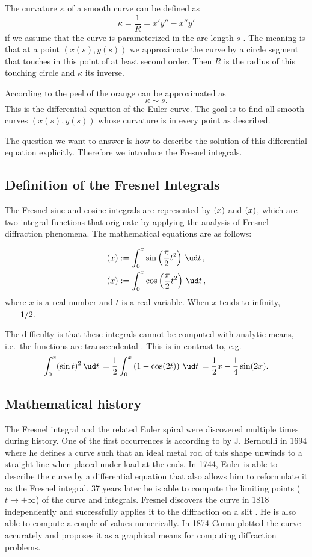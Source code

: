 \documentclass[12pt]{article}
\let\C=\relax
\DeclareMathOperator\C{C} %
\def\d#1{{\,\ud#1\,}}
\let\S=\relax
\DeclareMathOperator\S{S} %
\begin{document}
The curvature $\kappa$ of a smooth curve can be defined as 
\[  \kappa=\frac1R = x'y'' -x''y'
\] if we assume that the curve is parameterized in the arc length $s$ \cite{BH12}.  The meaning is that at a point $(x(s),y(s))$ we approximate the curve by a circle segment that touches in this point of at least second order.  Then $R$ is the radius of this touching circle and $\kappa$ its inverse.

According to \cite{BH12} the peel of the orange can be approximated as
\begin{equation}
  \kappa \sim s  \label{e:eulerSpiral}.
\end{equation}  This is the differential equation of the Euler curve.  The goal is to find all smooth curves $(x(s),y(s))$ whose curvature is in every point as described.

The question we want to answer is how to describe the solution of this differential equation explicitly.  Therefore we introduce the Fresnel integrals.


\subsection{Definition of the Fresnel Integrals}
The Fresnel sine and cosine integrals are represented by $\S(x)$ and $\C(x)$, which are two integral functions that originate by applying the analysis of Fresnel diffraction phenomena. The mathematical equations are as follows:

\begin{align}
  \S(x) &:= \int_0^x  \sin\left(\frac\pi2 t^2\right) \d{t}, \\
  \C(x) &:= \int_0^x \cos\left(\frac\pi2 t^2\right) \d{t},
\end{align}
where $x$ is a real number and $t$ is a real variable. When $x$ tends to infinity, $\S=\C=1/2$.

The difficulty is that these integrals cannot be computed with analytic means, i.e.~the functions are transcendental \cite[p.195ff]{AS}.  This is in contrast to, e.g.
$$ \int_0^x (\sin t)^2 \d{t} = \frac12\int_0^x \left(1-\cos(2t)\right)\d{t} = \frac12x -\frac14\sin(2x).
$$


\subsection{Mathematical history}
The Fresnel integral and the related Euler spiral were discovered multiple times during history.  One of the first occurrences is according to \cite{Lev08} by J. Bernoulli in 1694 where he defines a curve such that an ideal metal rod of this shape unwinds to a straight line when placed under load at the ends.  In 1744, Euler is able to describe the curve by a differential equation that also allows him to reformulate it as the Fresnel integral.  37 years later he is able to compute the limiting points ($t\to\pm\infty$) of the curve and integrals.  Fresnel discovers the curve in 1818 independently and successfully applies it to the diffraction on a slit \cite{Lev08}.  He is also able to compute a couple of values numerically.  In 1874 Cornu plotted the curve accurately and proposes it as a graphical means for computing diffraction problems.
\end{document}
